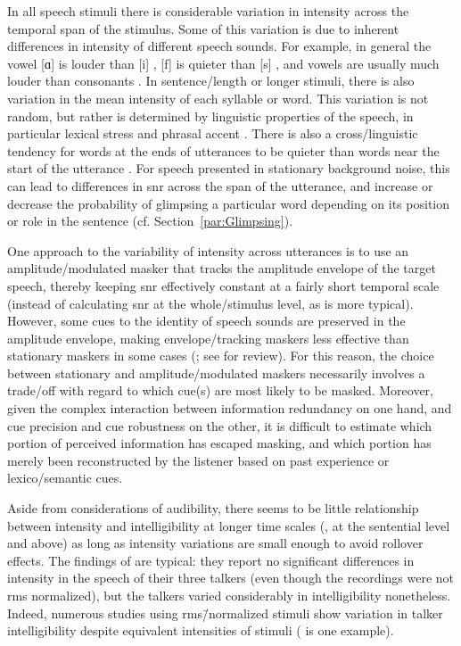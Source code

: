 In all speech stimuli there is considerable variation in intensity across the temporal span of the stimulus.  Some of this variation is due to inherent differences in intensity of different speech sounds.  For example, in general the vowel [ɑ] is louder than [i] \citep{Ladefoged1967}, [f] is quieter than [s] \citep{sowl}, and vowels are usually much louder than consonants \citep{HoriiEtAl1971}.  In sentence\-/length or longer stimuli, there is also variation in the mean intensity of each syllable or word.  This variation is not random, but rather is determined by linguistic properties of the speech, in particular lexical stress and phrasal accent \citep{Fry1955, SluijterVanHeuven1993, SluijterVanHeuven1996, PlagEtAl2011}.  There is also a cross\-/linguistic tendency for words at the ends of utterances to be quieter than words near the start of the utterance \citep{StrikBoves1995, TrouvainEtAl1998}.  For speech presented in stationary background noise, this can lead to differences in \ac{snr} across the span of the utterance, and increase or decrease the probability of glimpsing a particular word depending on its position or role in the sentence (cf. Section~\ref{par:Glimpsing}).

One approach to the variability of intensity across utterances is to use an amplitude\-/modulated masker that tracks the amplitude envelope of the target speech, thereby keeping \ac{snr} effectively constant at a fairly short temporal scale (instead of calculating \ac{snr} at the whole\-/stimulus level, as is more typical).  However, some cues to the identity of speech sounds are preserved in the amplitude envelope, making envelope\-/tracking maskers less effective than stationary maskers in some cases (\citealt{HoriiEtAl1971, VanTasellEtAl1987, BashfordEtAl1996}; see \citealt{Wright2004b} for review).  For this reason, the choice between stationary and amplitude\-/modulated maskers necessarily involves a trade\-/off with regard to which cue(s) are most likely to be masked.  Moreover, given the complex interaction between information redundancy on one hand, and cue precision and cue robustness on the other, it is difficult to estimate which portion of perceived information has escaped masking, and which portion has merely been reconstructed by the listener based on past experience or lexico\-/semantic cues.

Aside from considerations of audibility, there seems to be little relationship between intensity and intelligibility at longer time scales (\ie, at the sentential level and above) as long as intensity variations are small enough to avoid rollover effects.\footnotemark{}  The findings of \citet{BondMoore1994} are typical: they report no significant differences in intensity in the speech of their three talkers (even though the recordings were not \ac{rms} normalized), but the talkers varied considerably in intelligibility nonetheless.  Indeed, numerous studies using \ac{rms}\=/normalized stimuli show variation in talker intelligibility despite equivalent intensities of stimuli (\citealt{McCloyEtAl2013} is one example).  

